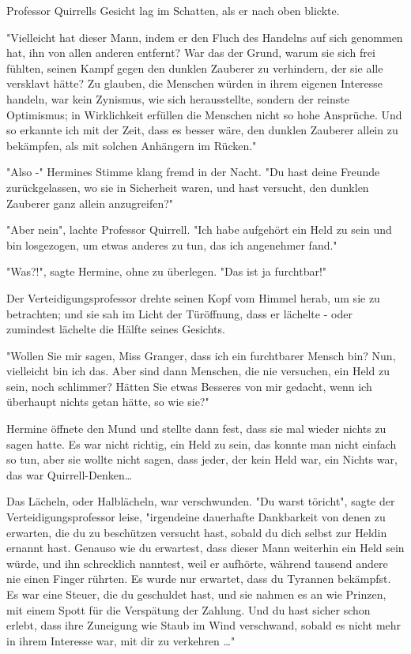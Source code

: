 {Professor Quirrells Gesicht lag im Schatten, als er nach oben blickte.

"Vielleicht hat dieser Mann, indem er den Fluch des Handelns auf sich genommen hat, ihn von allen anderen entfernt? War das der Grund, warum sie sich frei fühlten, seinen Kampf gegen den dunklen Zauberer zu verhindern, der sie alle versklavt hätte? Zu glauben, die Menschen würden in ihrem eigenen Interesse handeln, war kein Zynismus, wie sich herausstellte, sondern der reinste Optimismus; in Wirklichkeit erfüllen die Menschen nicht so hohe Ansprüche. Und so erkannte ich mit der Zeit, dass es besser wäre, den dunklen Zauberer allein zu bekämpfen, als mit solchen Anhängern im Rücken."

"Also -" Hermines Stimme klang fremd in der Nacht. "Du hast deine Freunde zurückgelassen, wo sie in Sicherheit waren, und hast versucht, den dunklen Zauberer ganz allein anzugreifen?"

"Aber nein", lachte Professor Quirrell. "Ich habe aufgehört ein Held zu sein und bin losgezogen, um etwas anderes zu tun, das ich angenehmer fand."

"Was?!", sagte Hermine, ohne zu überlegen. "Das ist ja furchtbar!"

Der Verteidigungsprofessor drehte seinen Kopf vom Himmel herab, um sie zu betrachten; und sie sah im Licht der Türöffnung, dass er lächelte - oder zumindest lächelte die Hälfte seines Gesichts.

"Wollen Sie mir sagen, Miss Granger, dass ich ein furchtbarer Mensch bin? Nun, vielleicht bin ich das. Aber sind dann Menschen, die nie versuchen, ein Held zu sein, noch schlimmer? Hätten Sie etwas Besseres von mir gedacht, wenn ich überhaupt nichts getan hätte, so wie sie?"

Hermine öffnete den Mund und stellte dann fest, dass sie mal wieder nichts zu sagen hatte. Es war nicht richtig, ein Held zu sein, das konnte man nicht einfach so tun, aber sie wollte nicht sagen, dass jeder, der kein Held war, ein Nichts war, das war Quirrell-Denken…

Das Lächeln, oder Halblächeln, war verschwunden. "Du warst töricht", sagte der Verteidigungsprofessor leise, "irgendeine dauerhafte Dankbarkeit von denen zu erwarten, die du zu beschützen versucht hast, sobald du dich selbst zur Heldin ernannt hast. Genauso wie du erwartest, dass dieser Mann weiterhin ein Held sein würde, und ihn schrecklich nanntest, weil er aufhörte, während tausend andere nie einen Finger rührten. Es wurde nur erwartet, dass du Tyrannen bekämpfst. Es war eine Steuer, die du geschuldet hast, und sie nahmen es an wie Prinzen, mit einem Spott für die Verspätung der Zahlung. Und du hast sicher schon erlebt, dass ihre Zuneigung wie Staub im Wind verschwand, sobald es nicht mehr in ihrem Interesse war, mit dir zu verkehren …"

}

